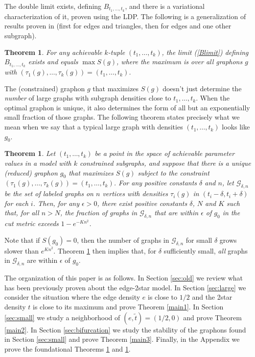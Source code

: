 \documentclass[12pt]{amsart}
\newcommand{\tdens}{\tau}
\newcommand{\1}{\mathbf{1}}
\newtheorem{theorem}[lemma]{Theorem}
\begin{document}
  The double limit exists, defining $B_{t_1,\ldots,t_k}$, and there is a
  variational characterization of it, proven using the LDP. The following 
  is a generalization of results proven in \cite{RS1, RS2} (first for
  edges and triangles, then for edges and one other subgraph). 

\begin{theorem}\label{thmBoltzmann}
  For any achievable $k$-tuple $(t_1,\ldots,t_k)$, the limit (\ref{Blimit})
  defining $B_{t_1,\ldots, t_k}$ exists and equals $\max S(g)$, where the
  maximum is over all graphons $g$ with $(\tdens_1(g),\ldots,\tdens_k(g)) = (t_1,\ldots,t_k)$.
\end{theorem}

The (constrained) graphon $g$ that maximizes $S(g)$ doesn't just determine the {\em number}
of large graphs with subgraph densities close to $t_1, \ldots, t_k$. When the optimal 
graphon is unique, it also determines the form of all but an exponentially small 
fraction of those graphs. The following theorem states precisely what we
 mean when we say that a typical large graph with densities $(t_1,\ldots,t_k)$
looks like $g_0$.

\begin{theorem}\label{thmTypicality}
Let $(t_1,\ldots,t_k)$ be a point in the space of achievable parameter values in a
model with $k$ constrained subgraphs, and suppose that there
is a unique (reduced) graphon
$g_0$ that maximizes $S(g)$ subject to the constraint
$(\tdens_1(g),\ldots,\tdens_k(g)) = (t_1,\ldots,t_k)$.
For any positive constants $\delta$ and  $n$, let
$\mathcal{G}_{\delta,n}$ be the set of
labeled graphs on $n$ vertices with densities $\tdens_i(g)$ in $(t_i-\delta,
t_i+\delta)$ for each $i$. Then, for any $\epsilon>0$,
there exist
positive constants $\delta$, $N$ and $K$ such that, for all $n>N$, the fraction of
graphs in $\mathcal{G}_{\delta,n}$ that are within $\epsilon$ of $g_0$
in the cut metric
exceeds $1 - e^{-Kn^2}$.
\end{theorem}

Note that if $S(g_0)=0$, then the number of graphs in $\mathcal{G}_{\delta,n}$ 
for small $\delta$ grows slower than $e^{Kn^2}$. Theorem \ref{thmTypicality}
then implies that, for $\delta$ sufficiently small, {\em all\/} graphs in 
$\mathcal{G}_{\delta,n}$ are within $\epsilon$ of $g_0$. 


The organization of this paper is as follows. In Section \ref{sec:old} we review what
has been previously proven about the edge-2star model. In Section \ref{sec:large} 
we consider the situation where the edge density $e$ is close to $1/2$ and the 2star 
density $t$ is close to its maximum and prove Theorem \ref{main1}. In Section 
\ref{sec:small} we study a neighborhood of $(e,\tilde t) = (1/2, 0)$ and prove 
Theorem \ref{main2}. In Section \ref{sec:bifurcation} we study the stability of 
the graphons found in Section \ref{sec:small} and prove Theorem \ref{main3}. 
Finally, 
in the Appendix we prove the foundational Theorems \ref{thmBoltzmann} and 
\ref{thmTypicality}.
\end{document}
